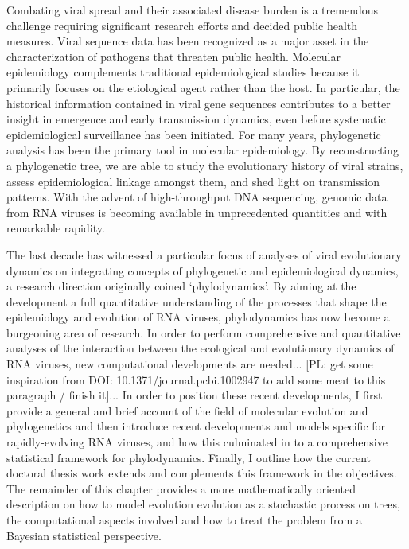 Combating viral spread and their associated disease burden is a tremendous challenge requiring significant research efforts and decided public health measures. 
Viral sequence data has been recognized as a major asset in the characterization of pathogens that threaten public health.
Molecular epidemiology complements traditional epidemiological studies because it primarily focuses on the etiological agent rather than the host. %
In particular, the historical information contained in viral gene sequences contributes to a better insight in emergence and early transmission dynamics, even before systematic epidemiological surveillance has been initiated. 
For many years, phylogenetic analysis has been the primary tool in molecular epidemiology. 
By reconstructing a phylogenetic tree, we are able to study the evolutionary history of viral strains, assess epidemiological linkage amongst them, and shed light on transmission patterns. 
With the advent of high-throughput DNA sequencing, genomic data from RNA viruses is becoming available in unprecedented quantities and with remarkable rapidity. 


The last decade has witnessed a particular focus of analyses of viral evolutionary dynamics on integrating concepts of phylogenetic and epidemiological dynamics, a research direction originally coined `phylodynamics'. %
By aiming at the development a full quantitative understanding of the processes that shape the epidemiology and evolution of RNA viruses,
phylodynamics has now become a burgeoning area of research.
In order to perform comprehensive and quantitative analyses of the interaction between the ecological and evolutionary dynamics of RNA viruses, new computational developments are needed... [PL: get some inspiration from  DOI: 10.1371/journal.pcbi.1002947 to add some meat to this paragraph / finish it]...
In order to position these recent developments, I first provide a general and brief account of the field of molecular evolution and phylogenetics and then introduce recent developments and models specific for rapidly-evolving RNA viruses, and how this culminated in to a comprehensive statistical framework for phylodynamics. Finally, I outline how the current doctoral thesis work extends and complements this framework in the objectives.
The remainder of this chapter provides a more mathematically oriented description on how to model evolution evolution as a stochastic process on trees, the computational aspects involved and how to treat the problem from a Bayesian statistical perspective.







